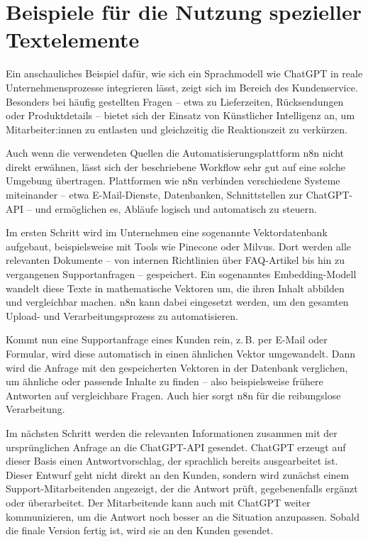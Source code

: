 \documentclass[utf8,biblatex]{bremerhaven_lni}
\begin{document}
\blindtext

\section{Beispiele für die Nutzung spezieller Textelemente}

Ein anschauliches Beispiel dafür, wie sich ein Sprachmodell wie ChatGPT in reale Unternehmensprozesse integrieren lässt, zeigt sich im Bereich des Kundenservice. Besonders bei häufig gestellten Fragen – etwa zu Lieferzeiten, Rücksendungen oder Produktdetails – bietet sich der Einsatz von Künstlicher Intelligenz an, um Mitarbeiter:innen zu entlasten und gleichzeitig die Reaktionszeit zu verkürzen.

Auch wenn die verwendeten Quellen die Automatisierungsplattform n8n nicht direkt erwähnen, lässt sich der beschriebene Workflow sehr gut auf eine solche Umgebung übertragen. Plattformen wie n8n verbinden verschiedene Systeme miteinander – etwa E-Mail-Dienste, Datenbanken, Schnittstellen zur ChatGPT-API – und ermöglichen es, Abläufe logisch und automatisch zu steuern.

Im ersten Schritt wird im Unternehmen eine sogenannte Vektordatenbank aufgebaut, beispielsweise mit Tools wie Pinecone oder Milvus. Dort werden alle relevanten Dokumente – von internen Richtlinien über FAQ-Artikel bis hin zu vergangenen Supportanfragen – gespeichert. Ein sogenanntes Embedding-Modell wandelt diese Texte in mathematische Vektoren um, die ihren Inhalt abbilden und vergleichbar machen. n8n kann dabei eingesetzt werden, um den gesamten Upload- und Verarbeitungsprozess zu automatisieren.

Kommt nun eine Supportanfrage eines Kunden rein, z. B. per E-Mail oder Formular, wird diese automatisch in einen ähnlichen Vektor umgewandelt. Dann wird die Anfrage mit den gespeicherten Vektoren in der Datenbank verglichen, um ähnliche oder passende Inhalte zu finden – also beispielsweise frühere Antworten auf vergleichbare Fragen. Auch hier sorgt n8n für die reibungslose Verarbeitung.

Im nächsten Schritt werden die relevanten Informationen zusammen mit der ursprünglichen Anfrage an die ChatGPT-API gesendet. ChatGPT erzeugt auf dieser Basis einen Antwortvorschlag, der sprachlich bereits ausgearbeitet ist. Dieser Entwurf geht nicht direkt an den Kunden, sondern wird zunächst einem Support-Mitarbeitenden angezeigt, der die Antwort prüft, gegebenenfalls ergänzt oder überarbeitet. Der Mitarbeitende kann auch mit ChatGPT weiter kommunizieren, um die Antwort noch besser an die Situation anzupassen. Sobald die finale Version fertig ist, wird sie an den Kunden gesendet.
\end{document}
